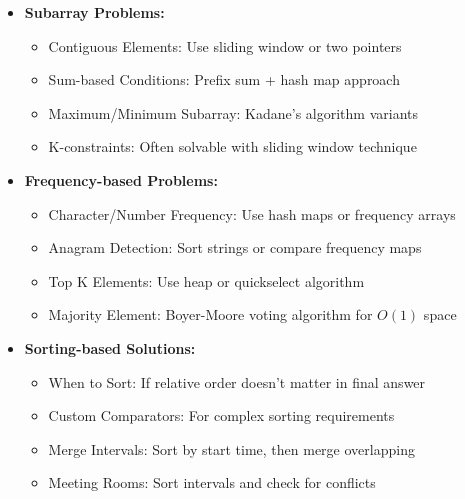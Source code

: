 \documentclass[a4paper,10pt]{book}
\begin{document}
\begin{itemize}[leftmargin=*]
    \item \textbf{Subarray Problems:}
    \begin{itemize}
        \item Contiguous Elements: Use sliding window or two pointers
        \item Sum-based Conditions: Prefix sum + hash map approach
        \item Maximum/Minimum Subarray: Kadane's algorithm variants
        \item K-constraints: Often solvable with sliding window technique
    \end{itemize}
    
    \item \textbf{Frequency-based Problems:}
    \begin{itemize}
        \item Character/Number Frequency: Use hash maps or frequency arrays
        \item Anagram Detection: Sort strings or compare frequency maps
        \item Top K Elements: Use heap or quickselect algorithm
        \item Majority Element: Boyer-Moore voting algorithm for $O(1)$ space
    \end{itemize}
    
    \item \textbf{Sorting-based Solutions:}
    \begin{itemize}
        \item When to Sort: If relative order doesn't matter in final answer
        \item Custom Comparators: For complex sorting requirements
        \item Merge Intervals: Sort by start time, then merge overlapping
        \item Meeting Rooms: Sort intervals and check for conflicts
    \end{itemize}
\end{itemize}
\end{document}
